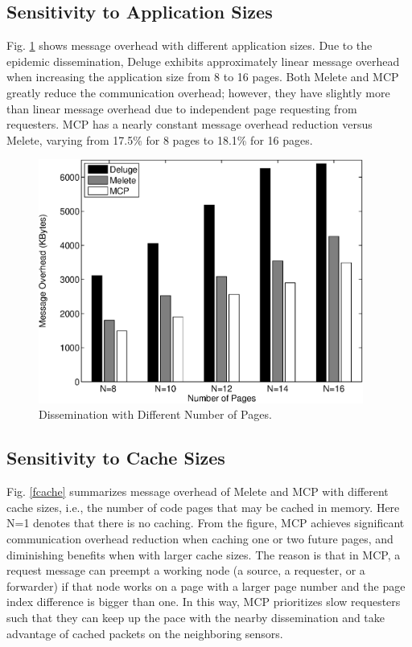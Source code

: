 \subsection{Sensitivity to Application Sizes}
Fig. \ref{fnumPage} shows message overhead with different application sizes. 
Due to the epidemic dissemination, Deluge exhibits approximately linear message overhead when
increasing the application size from 8 to 16 pages. Both Melete and MCP greatly reduce the communication overhead; however, they have slightly more than linear message overhead due to independent page requesting from requesters. MCP has a nearly constant message overhead reduction versus Melete, varying from 17.5\% for 8 pages to 18.1\% for 16 pages.

\begin{figure}[htbp]
\centering
\includegraphics[width=4.2in]{figures/fdist2.eps}
\caption{Dissemination with Different Number of Pages.}
\label{fnumPage}
\end{figure}


\subsection{Sensitivity to Cache Sizes}
Fig. \ref{fcache} summarizes message overhead of Melete and MCP with different cache sizes, i.e., the number of code pages that may be cached in memory. Here N=1 denotes that there is no caching. From the figure, MCP achieves significant communication overhead reduction when caching one or two future pages, and diminishing benefits when with larger cache sizes. The reason is that in MCP, a request message can preempt a working node (a source, a requester, or a forwarder) if that node works on a page with a larger page number and the page index difference is bigger than one. In this way, MCP prioritizes slow requesters such that they can keep up the pace with the nearby dissemination and take advantage of cached packets on the neighboring sensors.

